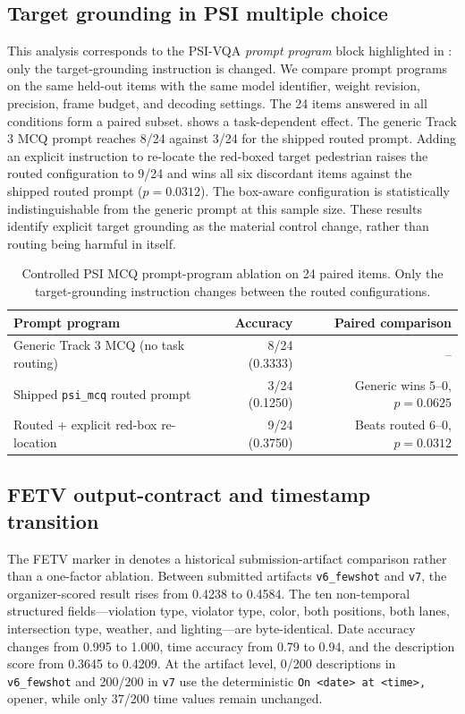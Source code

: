 \documentclass[runningheads]{llncs}
\begin{document}
\subsection{Target grounding in PSI multiple choice}
This analysis corresponds to the PSI-VQA \emph{prompt program} block highlighted in : only the target-grounding instruction is changed. We compare prompt programs on the same held-out items with the same model identifier, weight revision, precision, frame budget, and decoding settings. The 24 items answered in all conditions form a paired subset.  shows a task-dependent effect. The generic Track 3 MCQ prompt reaches 8/24 against 3/24 for the shipped routed prompt. Adding an explicit instruction to re-locate the red-boxed target pedestrian raises the routed configuration to 9/24 and wins all six discordant items against the shipped routed prompt ($p=0.0312$). The box-aware configuration is statistically indistinguishable from the generic prompt at this sample size. These results identify explicit target grounding as the material control change, rather than routing being harmful in itself.

\begin{table}[t]
\caption{Controlled PSI MCQ prompt-program ablation on 24 paired items. Only the target-grounding instruction changes between the routed configurations.}
\label{tab:prompt}
\centering
\small
\begin{tabularx}{\textwidth}{@{}Yrr@{}}
\toprule
Prompt program & Accuracy & Paired comparison \\
\midrule
Generic Track 3 MCQ (no task routing) & 8/24 (0.3333) & -- \\
Shipped \texttt{psi\_mcq} routed prompt & 3/24 (0.1250) & Generic wins 5--0, $p=0.0625$ \\
Routed + explicit red-box re-location & 9/24 (0.3750) & Beats routed 6--0, $p=0.0312$ \\
\bottomrule
\end{tabularx}
\end{table}

\subsection{FETV output-contract and timestamp transition}
The FETV marker in  denotes a historical submission-artifact comparison rather than a one-factor ablation. Between submitted artifacts \texttt{v6\_fewshot} and \texttt{v7}, the organizer-scored result rises from 0.4238 to 0.4584. The ten non-temporal structured fields---violation type, violator type, color, both positions, both lanes, intersection type, weather, and lighting---are byte-identical. Date accuracy changes from 0.995 to 1.000, time accuracy from 0.79 to 0.94, and the description score from 0.3645 to 0.4209. At the artifact level, 0/200 descriptions in \texttt{v6\_fewshot} and 200/200 in \texttt{v7} use the deterministic \texttt{On <date> at <time>,} opener, while only 37/200 time values remain unchanged.
\end{document}
